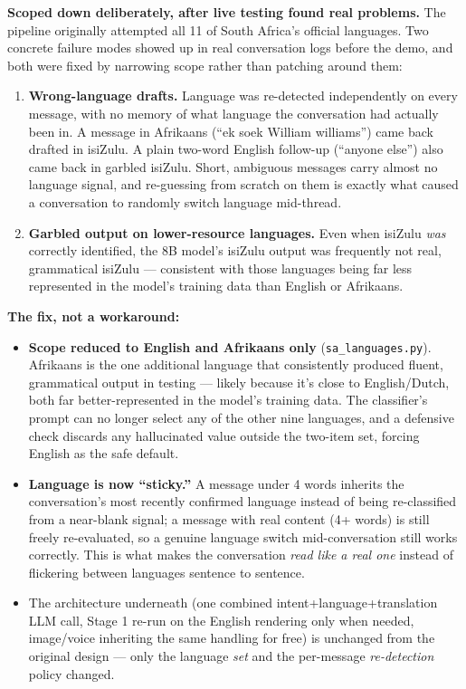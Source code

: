\documentclass[11pt, a4paper]{article}
\begin{document}
\textbf{Scoped down deliberately, after live testing found real problems.} The pipeline originally attempted all 11 of South Africa's official languages. Two concrete failure modes showed up in real conversation logs before the demo, and both were fixed by narrowing scope rather than patching around them:

\begin{enumerate}
    \item \textbf{Wrong-language drafts.} Language was re-detected independently on every message, with no memory of what language the conversation had actually been in. A message in Afrikaans (``ek soek William williams'') came back drafted in isiZulu. A plain two-word English follow-up (``anyone else'') also came back in garbled isiZulu. Short, ambiguous messages carry almost no language signal, and re-guessing from scratch on them is exactly what caused a conversation to randomly switch language mid-thread.
    \item \textbf{Garbled output on lower-resource languages.} Even when isiZulu \emph{was} correctly identified, the 8B model's isiZulu output was frequently not real, grammatical isiZulu --- consistent with those languages being far less represented in the model's training data than English or Afrikaans.
\end{enumerate}

\textbf{The fix, not a workaround:}
\begin{itemize}
    \item \textbf{Scope reduced to English and Afrikaans only} (\texttt{sa\_languages.py}). Afrikaans is the one additional language that consistently produced fluent, grammatical output in testing --- likely because it's close to English/Dutch, both far better-represented in the model's training data. The classifier's prompt can no longer select any of the other nine languages, and a defensive check discards any hallucinated value outside the two-item set, forcing English as the safe default.
    \item \textbf{Language is now ``sticky.''} A message under 4 words inherits the conversation's most recently confirmed language instead of being re-classified from a near-blank signal; a message with real content (4+ words) is still freely re-evaluated, so a genuine language switch mid-conversation still works correctly. This is what makes the conversation \emph{read like a real one} instead of flickering between languages sentence to sentence.
    \item The architecture underneath (one combined intent+language+translation LLM call, Stage 1 re-run on the English rendering only when needed, image/voice inheriting the same handling for free) is unchanged from the original design --- only the language \emph{set} and the per-message \emph{re-detection} policy changed.
\end{itemize}
\end{document}
